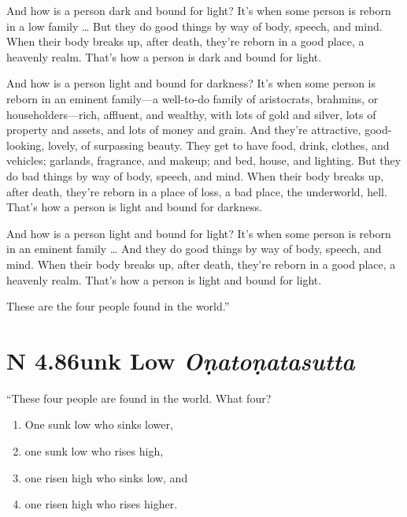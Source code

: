 \documentclass[12pt,openany]{book}%
\newcommand*{\suttatitleacronym}[1]{\smaller[2]{#1}\vspace*{.3em}}
\newcommand*{\suttatitletranslation}[1]{\linebreak{#1}}
\newcommand*{\suttatitleroot}[1]{\linebreak\smaller[2]\itshape{#1}}
\newcommand*{\tocacronym}[1]{\hspace*{-3.3em}{#1}\quad}
\newcommand*{\toctranslation}[1]{#1}
\newcommand*{\tocroot}[1]{(\textit{#1})}
\begin{document}
And how is a person dark and bound for light? It’s when some person is reborn in a low family … But they do good things by way of body, speech, and mind. When their body breaks up, after death, they’re reborn in a good place, a heavenly realm. That’s how a person is dark and bound for light. 

And how is a person light and bound for darkness? It’s when some person is reborn in an eminent family—a well-to-do family of aristocrats, brahmins, or householders—rich, affluent, and wealthy, with lots of gold and silver, lots of property and assets, and lots of money and grain. And they’re attractive, good-looking, lovely, of surpassing beauty. They get to have food, drink, clothes, and vehicles; garlands, fragrance, and makeup; and bed, house, and lighting. But they do bad things by way of body, speech, and mind. When their body breaks up, after death, they’re reborn in a place of loss, a bad place, the underworld, hell. That’s how a person is light and bound for darkness. 

And how is a person light and bound for light? It’s when some person is reborn in an eminent family … And they do good things by way of body, speech, and mind. When their body breaks up, after death, they’re reborn in a good place, a heavenly realm. That’s how a person is light and bound for light. 

These are the four people found in the world.” 

%
\section*{{\suttatitleacronym AN 4.86}{\suttatitletranslation Sunk Low }{\suttatitleroot Oṇatoṇatasutta}}
\addcontentsline{toc}{section}{\tocacronym{AN 4.86} \toctranslation{Sunk Low } \tocroot{Oṇatoṇatasutta}}

“These four people are found in the world. What four? 

\begin{enumerate}%
\item One sunk low who sinks lower, %
\item one sunk low who rises high, %
\item one risen high who sinks low, and %
\item one risen high who rises higher. %
\end{enumerate}
\end{document}
